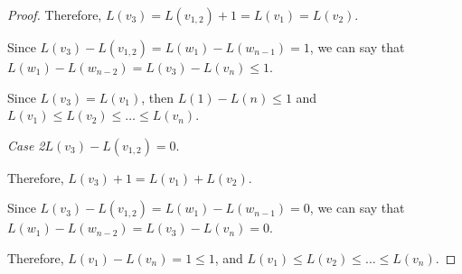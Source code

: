 \documentclass{article}
\begin{document}
\begin{proof}
Therefore, $L(v_3) = L(v_{1,2}) + 1 = L(v_1) = L(v_2)$. 

Since $L(v_3) - L(v_{1,2}) = L(w_1) - L(w_{n-1}) = 1$, we can say that $L(w_1) - L(w_{n-2}) = L(v_3) - L(v_n) \leq 1$. 

Since $L(v_3) = L(v_1)$, then $L(1) - L(n) \leq 1$ and $L(v_1) \leq L(v_2) \leq \ldots \leq L(v_n)$.

\textit{Case 2}$L(v_3) - L(v_{1,2}) = 0$. 

Therefore, $L(v_3) + 1 = L(v_1) + L(v_2)$. 

Since $L(v_3) - L(v_{1,2}) = L(w_1) - L(w_{n-1}) = 0$, we can say that $L(w_1) - L(w_{n-2}) = L(v_3) - L(v_n) = 0$. 

Therefore, $L(v_1) - L(v_n)  = 1 \leq 1$, and $L(v_1) \leq L(v_2) \leq \ldots \leq L(v_n)$. \qedhere

\end{proof}	  
\end{document}

